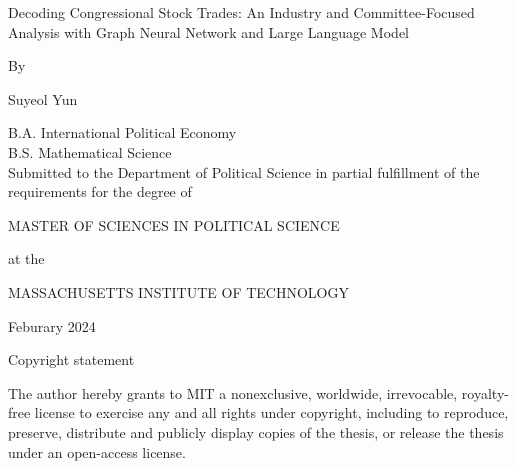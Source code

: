 \documentclass[15pt,letterpaper]{article}
\newcommand\spacingset[1]{\renewcommand{\baselinestretch}
{#1}\small\normalsize}
\begin{document}
\spacingset{1.25}

\setcounter{page}{1}
\vspace{-.1in}


\begin{titlepage}
  \thispagestyle{plain}
  \begin{center}
      \Large{Decoding Congressional Stock Trades: An Industry and Committee-Focused Analysis with Graph Neural Network and Large Language Model}

      \vspace{0.5cm}
      \large{By}

      \vspace{0.5cm}
      \large{Suyeol Yun}

      \vspace{0.5cm}
      B.A. International Political Economy\\
      B.S. Mathematical Science\\
      \vspace{0.5cm}
      Submitted to the Department of Political Science in partial fulfillment of the requirements for the degree of

      \vspace{0.5cm}
      MASTER OF SCIENCES IN POLITICAL SCIENCE

      \vspace{0.5cm}
      at the

      \vspace{0.5cm}
      MASSACHUSETTS INSTITUTE OF TECHNOLOGY 

      \vspace{0.5cm}
      Feburary 2024

      \vspace{0.5cm}
      Copyright statement

      \vspace{0.5cm}
      The author hereby grants to MIT a nonexclusive, worldwide, irrevocable, royalty-free license to exercise any and all rights under copyright, including to reproduce, preserve, distribute and publicly display copies of the thesis, or release the thesis under an open-access license.

      \vspace{1cm}
  \end{center}


\end{titlepage}
\end{document}
